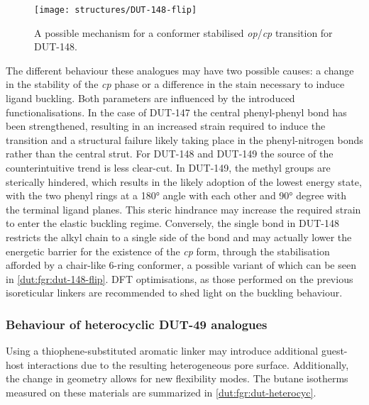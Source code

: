 \begin{figure}[htb]
    \centering
    \texttt{[image: structures/DUT-148-flip]}%
    \caption{A possible mechanism for a conformer stabilised 
    \textit{op}/\textit{cp} transition for DUT-148.}%
    \label{dut:fgr:dut-148-flip}
\end{figure}

The different behaviour these analogues may have two possible
causes: a change in the stability of the \textit{cp} phase or a 
difference in the stain necessary to induce ligand buckling. Both
parameters are influenced by the introduced functionalisations. 
In the case of DUT-147 the central phenyl-phenyl bond
has been strengthened, resulting in an increased strain required to
induce the transition and a structural failure likely taking place 
in the phenyl-nitrogen bonds rather than the central strut. 
For DUT-148 and DUT-149 the source of the 
counterintuitive trend is less clear-cut. In DUT-149, the methyl
groups are sterically hindered, which results in the likely
adoption of the lowest energy state, with the two phenyl rings
at a \ang{180} angle with each other and \ang{90} degree with the
terminal ligand planes. 
This steric hindrance may increase the required strain to 
enter the elastic buckling regime. Conversely, the 
single bond in DUT-148 restricts the alkyl chain to a single 
side of the bond and may actually lower the energetic barrier for
the existence of the \textit{cp} form, through the stabilisation
afforded by a chair-like 6-ring conformer, a possible variant 
of which can be seen in \autoref{dut:fgr:dut-148-flip}. 
DFT optimisations, as those performed on the previous isoreticular
linkers are recommended to shed light on the buckling behaviour.

\subsubsection{Behaviour of heterocyclic DUT-49 analogues}

Using a thiophene-substituted aromatic linker may introduce additional
guest-host interactions due to the resulting heterogeneous pore
surface. Additionally, the change in geometry allows for new 
flexibility modes. The butane isotherms measured on these materials
are summarized in \autoref{dut:fgr:dut-heterocyc}.

